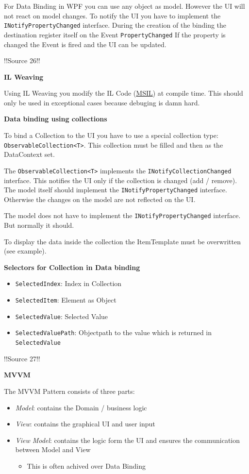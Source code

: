 \documentclass[10pt,twoside,landscape]{article}
\begin{document}
\begin{multicols}{3}
For Data Binding in WPF you can use any object as model.
However the UI will not react on model changes.
To notify the UI you have to implement the \texttt{INotifyPropertyChanged} interface.
During the creation of the binding the destination register itself on the Event \texttt{PropertyChanged}
If the property is changed the Event is fired and the UI can be updated.

!!Source 26!!

\textbf{IL Weaving}

Using IL Weaving you modify the IL Code (\href{../../../roam/20211003114528-microsoft_intermediate_language.org}{MSIL}) at compile time.
This should only be used in exceptional cases because debuging is damn hard.

\textbf{Data binding using collections}

To bind a Collection to the UI you have to use a special collection type: \texttt{ObservableCollection<T>}.
This collection must be filled and then as the DataContext set.

The \texttt{ObservableCollection<T>} implements the \texttt{INotifyCollectionChanged} interface.
This notifies the UI only if the collection is changed (add / remove).
The model itself should implement the \texttt{INotifyPropertyChanged} interface.
Otherwise the changes on the model are not reflected on the UI.

The model does not have to implement the \texttt{INotifyPropertyChanged} interface.
But normally it should.

To display the data inside the collection the ItemTemplate must be overwritten (see example).

\textbf{Selectors for Collection in Data binding}
\begin{itemize}
\item \texttt{SelectedIndex}: Index in Collection
\item \texttt{SelectedItem}: Element as Object
\item \texttt{SelectedValue}: Selected Value
\item \texttt{SelectedValuePath}: Objectpath to the value which is returned in \texttt{SelectedValue}
\end{itemize}

!!Source 27!!

\textbf{MVVM}

The MVVM Pattern consists of three parts:
\begin{itemize}
\item \emph{Model}: contains the Domain / business logic
\item \emph{View}: contains the graphical UI and user input
\item \emph{View Model}: contains the logic form the UI and ensures the communication between Model and View
\begin{itemize}
\item This is often achived over Data Binding
\end{itemize}
\end{itemize}



\end{multicols}
\end{document}
